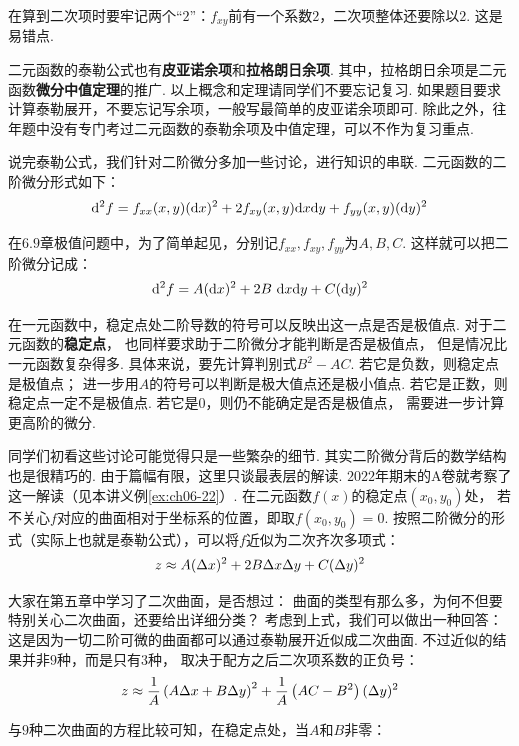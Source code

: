 在算到二次项时要牢记两个“$2$”：$f_{xy}$前有一个系数$2$，二次项整体还要除以$2$.
这是易错点.\par
二元函数的泰勒公式也有\textbf{皮亚诺余项}和\textbf{拉格朗日余项}.
其中，拉格朗日余项是二元函数\textbf{微分中值定理}的推广.
以上概念和定理请同学们不要忘记复习.
如果题目要求计算泰勒展开，不要忘记写余项，一般写最简单的皮亚诺余项即可.
除此之外，往年题中没有专门考过二元函数的泰勒余项及中值定理，可以不作为复习重点.\par
说完泰勒公式，我们针对二阶微分多加一些讨论，进行知识的串联.
二元函数的二阶微分形式如下：
$$
\setlength\abovedisplayskip{6pt}
\setlength\belowdisplayskip{6pt}
\d^2 f = f_{xx}(x,y)(\d x)^2 + 2f_{xy}(x,y)\d x \d y + f_{yy}(x,y)(\d y)^2
$$\par
在$6.9$章极值问题中，为了简单起见，分别记$f_{xx},f_{xy},f_{yy}$为$A,B,C$.
这样就可以把二阶微分记成：
$$
\setlength\abovedisplayskip{6pt}
\setlength\belowdisplayskip{6pt}
\d^2 f = A(\d x)^2 + 2B ~\d x \d y + C (\d y)^2
$$

在一元函数中，稳定点处二阶导数的符号可以反映出这一点是否是极值点.
对于二元函数的\textbf{稳定点}，
也同样要求助于二阶微分才能判断是否是极值点，
但是情况比一元函数复杂得多.
具体来说，要先计算判别式$B^2-AC$.
若它是负数，则稳定点是极值点；
进一步用$A$的符号可以判断是极大值点还是极小值点.
若它是正数，则稳定点一定不是极值点.
若它是$0$，则仍不能确定是否是极值点，
需要进一步计算更高阶的微分.

同学们初看这些讨论可能觉得只是一些繁杂的细节.
其实二阶微分背后的数学结构也是很精巧的.
由于篇幅有限，这里只谈最表层的解读.
$2022$年期末的A卷就考察了这一解读（见本讲义例\ref{ex:ch06-22}）.
在二元函数$f(x)$的稳定点$(x_0,y_0)$处，
若不关心$f$对应的曲面相对于坐标系的位置，即取$f(x_0,y_0)=0$.
按照二阶微分的形式（实际上也就是泰勒公式），可以将$f$近似为二次齐次多项式：
$$
\setlength\abovedisplayskip{6pt}
\setlength\belowdisplayskip{6pt}
z \approx A (\Delta x)^2 + 2B\Delta x \Delta y + C (\Delta y)^2
$$

大家在第五章中学习了二次曲面，是否想过：
曲面的类型有那么多，为何不但要特别关心二次曲面，还要给出详细分类？
考虑到上式，我们可以做出一种回答：
这是因为一切二阶可微的曲面都可以通过泰勒展开近似成二次曲面.
不过近似的结果并非$9$种，而是只有$3$种，
取决于配方之后二次项系数的正负号：
$$
\setlength\abovedisplayskip{6pt}
\setlength\belowdisplayskip{6pt}
z \approx \frac{1}{A}\left(A\Delta x + B\Delta y\right)^2 + \frac{1}{A} \left( AC-B^2\right) (\Delta y)^2
$$\par
与$9$种二次曲面的方程比较可知，在稳定点处，当$A$和$B$非零：

